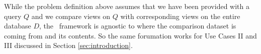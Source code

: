 While the problem definition above assumes that we have been provided with a
query $Q$ and we compare views on $Q$ with corresponding views on the entire
database $D$, the \VizRecDB\ framework is agnostic to where the comparison
dataset is coming from and its contents. So the same forumation works for Use
Cases II and III discussed in Section \ref{sec:introduction}. 




